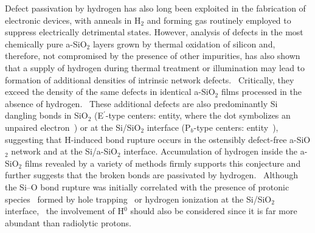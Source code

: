 \documentclass[aps,prb,reprint,superscriptaddress,showpacs]{revtex4-1}
\begin{document}
Defect passivation by hydrogen has also long been exploited in the fabrication of electronic devices, with anneals in H$_2$ and forming gas routinely employed to suppress electrically detrimental states. However, analysis of defects in the most chemically pure a-SiO$_2$ layers grown by thermal oxidation of silicon and, therefore, not compromised by the presence of other impurities, has also shown that a supply of hydrogen during thermal treatment or illumination may lead to formation of additional densities of intrinsic network defects.~\cite{pobegen_h_nbti} Critically, they exceed the density of the same defects in identical a-SiO$_2$ films processed in the absence of hydrogen.~\cite{wilde_hdefects2} These additional defects are also predominantly Si dangling bonds in SiO$_2$ (E$^\prime$-type centers: \setatomsep{2em}\hspace{2 pt} entity, where the dot symbolizes an unpaired electron~\cite{asio2_hetrap3}) or at the Si/SiO$_2$ interface (P$_b$-type centers: \hspace{2 pt} entity~\cite{stesmans_etrap,afanasev_pb}), suggesting that H-induced bond rupture occurs in the ostensibly defect-free a-SiO$_2$ network and at the Si/a-SiO$_2$ interface. Accumulation of hydrogen inside the a-SiO$_2$ films revealed by a variety of methods firmly supports this conjecture and further suggests that the broken bonds are passivated by hydrogen.~\cite{rivera_hdefect,wilde_hdefect} Although the \mbox{Si--O} bond rupture was initially correlated with the presence of protonic species~\cite{afanasev_prb,afanasev_protonic1} formed by hole trapping~\cite{AFANASEV01B} or hydrogen ionization at the Si/SiO$_2$ interface,~\cite{etrapping_1} the involvement of H$^0$ should also be considered since it is far more abundant than radiolytic protons. 

\end{document}
